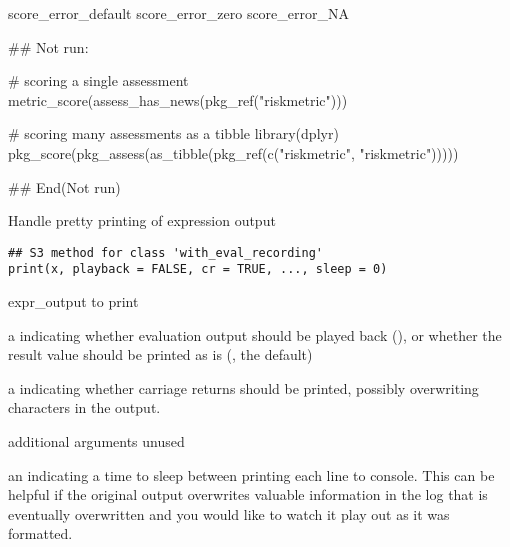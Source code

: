 \documentclass[a4paper]{book}
\begin{document}
%
\begin{SeeAlso}
score\_error\_default score\_error\_zero score\_error\_NA
\end{SeeAlso}
%
\begin{Examples}
\begin{ExampleCode}
## Not run: 

# scoring a single assessment
metric_score(assess_has_news(pkg_ref("riskmetric")))

# scoring many assessments as a tibble
library(dplyr)
pkg_score(pkg_assess(as_tibble(pkg_ref(c("riskmetric", "riskmetric")))))


## End(Not run)

\end{ExampleCode}
\end{Examples}
%
\begin{Description}
Handle pretty printing of expression output
\end{Description}
%
\begin{Usage}
\begin{verbatim}
## S3 method for class 'with_eval_recording'
print(x, playback = FALSE, cr = TRUE, ..., sleep = 0)
\end{verbatim}
\end{Usage}
%
\begin{Arguments}
\begin{ldescription}
\item[\code{x}] expr\_output to print

\item[\code{playback}] a  indicating whether evaluation output
should be played back (), or whether the result value should
be printed as is (, the default)

\item[\code{cr}] a  indicating whether carriage returns should be
printed, possibly overwriting characters in the output.

\item[\code{...}] additional arguments unused

\item[\code{sleep}] an  indicating a time to sleep between printing
each line to console. This can be helpful if the original output overwrites
valuable information in the log that is eventually overwritten and you
would like to watch it play out as it was formatted.
\end{ldescription}
\end{Arguments}
\end{document}
